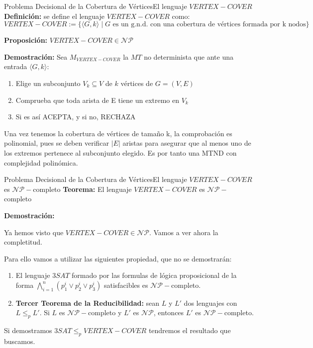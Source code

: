 \documentclass[10pt, envcountsect, presentation, aspectratio=169]{beamer}
\begin{document}
\begin{frame}{Problema Decisional de la Cobertura de Vértices}{El lenguaje $VERTEX-COVER$}
    \textbf{Definición:} se define el lenguaje $VERTEX-COVER$ como:
    $$
    VERTEX-COVER:=\{\langle G, k \rangle \mid G \text{ es un g.n.d. con una cobertura de vértices formada por k nodos}\}
    $$
    

    \textbf{Proposición:} $VERTEX-COVER \in \mathcal{NP}$

    \textbf{Demostración: } Sea $M_{VERTEX-COVER}$ la $MT$ no determinista que ante una entrada $\langle G, k \rangle$:

    \begin{enumerate}[I]
        \item Elige un subconjunto $V_k \subseteq V$ de $k$ vértices de $G=(V,E)$
        \item Comprueba que toda arista de E tiene un extremo en $V_k$
        \item Si es así ACEPTA, y si no, RECHAZA
    \end{enumerate}

    Una vez tenemos la cobertura de vértices de tamaño k, la comprobación es polinomial, pues se deben verificar $|E|$ aristas para asegurar que al menos uno de los extremos pertenece al subconjunto elegido.
    Es por tanto una MTND con complejidad polinómica.

\end{frame}

\begin{frame}{Problema Decisional de la Cobertura de Vértices}{El lenguaje $VERTEX-COVER$ es $\mathcal{NP}-$completo }
    \textbf{Teorema:} El lenguaje $VERTEX-COVER$ es $ \mathcal{NP}-$completo
    

    \textbf{Demostración: } 
    
    Ya hemos visto que $VERTEX-COVER \in \mathcal{NP}$. Vamos a ver ahora la completitud. 
    
    Para ello vamos a utilizar las siguientes propiedad, que no se demostrarán:
    \begin{enumerate}[1]
        \item El lenguaje $3SAT$ formado por las formulas de lógica proposicional de la forma $\bigwedge_{i=1}^n(p_1^i \vee p_2^i \vee p_3^i)$ satisfacibles es $\mathcal{NP}-$completo.
        \item \textbf{Tercer Teorema de la Reducibilidad:} sean $L$ y $L'$ dos lenguajes con $L \leq_p L'$. Si $L$ es $\mathcal{NP}-$completo y $L'$ es $\mathcal{NP}$, entonces $L'$ es $\mathcal{NP}-$completo. 
    \end{enumerate}
    Si demostramos $3SAT \leq_p VERTEX-COVER$ tendremos el resultado que buscamos. 
    

\end{frame}
\end{document}
